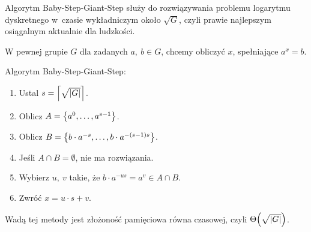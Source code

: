 Algorytm Baby-Step-Giant-Step służy do rozwiązywania problemu logarytmu dyskretnego w~czasie wykładniczym około \( \sqrt{G} \), czyli prawie najlepszym osiągalnym aktualnie dla ludzkości.

W pewnej grupie \( G \) dla zadanych \(a, \ b \in G \), chcemy obliczyć \( x \), spełniające \( a^x = b \).
\begin{greyframe}
	Algorytm Baby-Step-Giant-Step:
	\begin{enumerate}
		\item Ustal \( s = \left\lceil\sqrt{\left\lvert G\right\rvert}\right\rceil \).
		\item Oblicz \( A = \set{a^0, \dots, a^{s-1}} \).
		\item Oblicz \( B = \set{b \cdot a^{-s}, \dots,  b \cdot a^{-(s-1)s}} \).
		\item Jeśli \( A \cap B = \emptyset \), nie ma rozwiązania.
		\item Wybierz \( u, \ v \) takie, że \( b \cdot a^{-us} = a^v \in A \cap B \). \item Zwróć \( x = u \cdot s + v \).
	\end{enumerate}
\end{greyframe}

Wadą tej metody jest złożoność pamięciowa równa czasowej, czyli \( \Theta\pars{\sqrt{\abs{G}}} \).